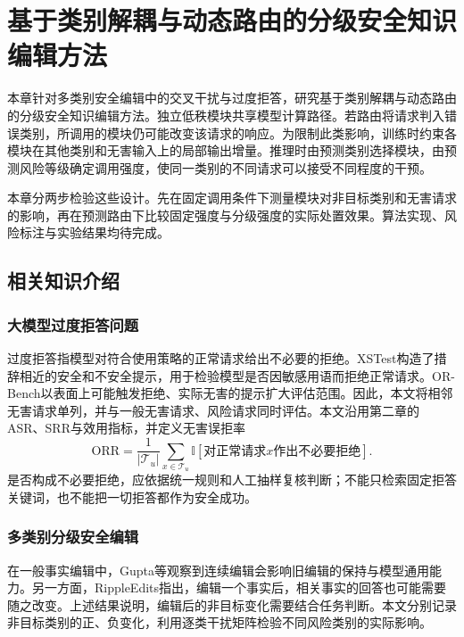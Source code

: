 \chapter{基于类别解耦与动态路由的分级安全知识编辑方法}\label{chap:graded-edit}

本章针对多类别安全编辑中的交叉干扰与过度拒答，研究基于类别解耦与动态路由的分级安全知识编辑方法。独立低秩模块共享模型计算路径。若路由将请求判入错误类别，所调用的模块仍可能改变该请求的响应。为限制此类影响，训练时约束各模块在其他类别和无害输入上的局部输出增量。推理时由预测类别选择模块，由预测风险等级确定调用强度，使同一类别的不同请求可以接受不同程度的干预。

本章分两步检验这些设计。先在固定调用条件下测量模块对非目标类别和无害请求的影响，再在预测路由下比较固定强度与分级强度的实际处置效果。算法实现、风险标注与实验结果均待完成。

\section{相关知识介绍}
\subsection{大模型过度拒答问题}

过度拒答指模型对符合使用策略的正常请求给出不必要的拒绝。XSTest构造了措辞相近的安全和不安全提示，用于检验模型是否因敏感用语而拒绝正常请求\cite{rottger2024xstest}。OR-Bench以表面上可能触发拒绝、实际无害的提示扩大评估范围\cite{cui2025orbench}。因此，本文将相邻无害请求单列，并与一般无害请求、风险请求同时评估。本文沿用第二章的ASR、SRR与效用指标，并定义无害误拒率
\begin{equation}
 \mathrm{ORR}=\frac{1}{|\mathcal T_u|}\sum_{x\in\mathcal T_u}
 \mathbb I[\text{对正常请求}x\text{作出不必要拒绝}].
 \label{eq:ch3-orr}
\end{equation}
是否构成不必要拒绝，应依据统一规则和人工抽样复核判断；不能只检索固定拒答关键词，也不能把一切拒答都作为安全成功。

\subsection{多类别分级安全编辑}

在一般事实编辑中，Gupta等观察到连续编辑会影响旧编辑的保持与模型通用能力\cite{gupta2024forgetting}。另一方面，RippleEdits指出，编辑一个事实后，相关事实的回答也可能需要随之改变\cite{cohen2024ripple}。上述结果说明，编辑后的非目标变化需要结合任务判断。本文分别记录非目标类别的正、负变化，利用逐类干扰矩阵检验不同风险类别的实际影响。

